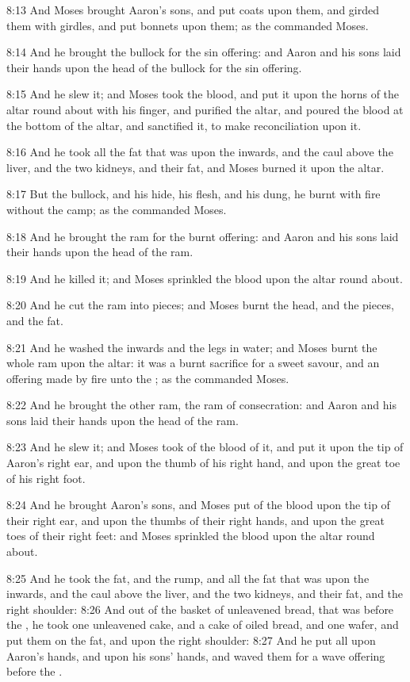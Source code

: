 8:13 And Moses brought Aaron's sons, and put coats upon them, and
girded them with girdles, and put bonnets upon them; as the \LORD
commanded Moses.

8:14 And he brought the bullock for the sin offering: and Aaron and
his sons laid their hands upon the head of the bullock for the sin
offering.

8:15 And he slew it; and Moses took the blood, and put it upon the
horns of the altar round about with his finger, and purified the
altar, and poured the blood at the bottom of the altar, and sanctified
it, to make reconciliation upon it.

8:16 And he took all the fat that was upon the inwards, and the caul
above the liver, and the two kidneys, and their fat, and Moses burned
it upon the altar.

8:17 But the bullock, and his hide, his flesh, and his dung, he burnt
with fire without the camp; as the \LORD commanded Moses.

8:18 And he brought the ram for the burnt offering: and Aaron and his
sons laid their hands upon the head of the ram.

8:19 And he killed it; and Moses sprinkled the blood upon the altar
round about.

8:20 And he cut the ram into pieces; and Moses burnt the head, and the
pieces, and the fat.

8:21 And he washed the inwards and the legs in water; and Moses burnt
the whole ram upon the altar: it was a burnt sacrifice for a sweet
savour, and an offering made by fire unto the \LORD; as the \LORD
commanded Moses.

8:22 And he brought the other ram, the ram of consecration: and Aaron
and his sons laid their hands upon the head of the ram.

8:23 And he slew it; and Moses took of the blood of it, and put it
upon the tip of Aaron's right ear, and upon the thumb of his right
hand, and upon the great toe of his right foot.

8:24 And he brought Aaron's sons, and Moses put of the blood upon the
tip of their right ear, and upon the thumbs of their right hands, and
upon the great toes of their right feet: and Moses sprinkled the blood
upon the altar round about.

8:25 And he took the fat, and the rump, and all the fat that was upon
the inwards, and the caul above the liver, and the two kidneys, and
their fat, and the right shoulder: 8:26 And out of the basket of
unleavened bread, that was before the \LORD, he took one unleavened
cake, and a cake of oiled bread, and one wafer, and put them on the
fat, and upon the right shoulder: 8:27 And he put all upon Aaron's
hands, and upon his sons' hands, and waved them for a wave offering
before the \LORD.

